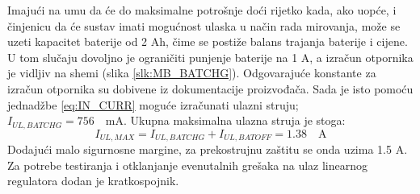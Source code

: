 Imajući na umu da će do maksimalne potrošnje doći rijetko kada, ako uopće, i činjenicu da će sustav imati mogućnost ulaska u način rada mirovanja, može se uzeti kapacitet baterije od 2 Ah, čime se postiže balans trajanja baterije i cijene. U tom slučaju dovoljno je ograničiti punjenje baterije na 1 A, a izračun otpornika je vidljiv na shemi (slika \ref{slk:MB_BATCHG}). Odgovarajuće konstante za izračun otpornika su dobivene iz dokumentacije proizvođača. Sada je isto pomoću jednadžbe \ref{eq:IN_CURR} moguće izračunati ulazni struju; ${I_{UL,BATCHG} = 756\quad \textrm{mA}}$. Ukupna maksimalna ulazna struja je stoga:
\begin{equation}
    I_{UL,MAX}=I_{UL,BATCHG}+I_{UL,BATOFF} = 1.38\quad \textrm{A}
    \label{eq:IN_CURR_MAX}
\end{equation}
Dodajući malo sigurnosne margine, za prekostrujnu zaštitu se onda uzima 1.5 A. Za potrebe testiranja i otklanjanje evenutalnih grešaka na ulaz linearnog regulatora dodan je kratkospojnik.

